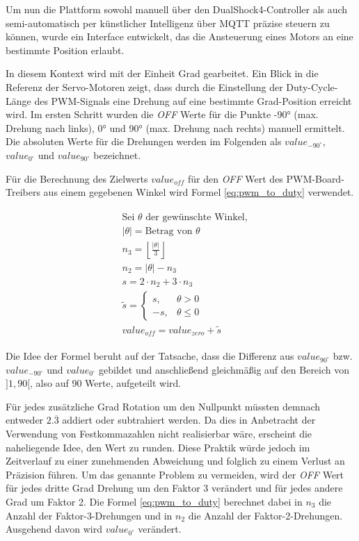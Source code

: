 Um nun die Plattform sowohl manuell über den DualShock4-Controller als auch semi-automatisch per künstlicher Intelligenz über MQTT präzise steuern zu können, wurde ein Interface entwickelt, das die Ansteuerung eines Motors an eine bestimmte Position erlaubt. 

In diesem Kontext wird mit der Einheit Grad gearbeitet. 
Ein Blick in die Referenz \cite{esp_servo_control} der Servo-Motoren zeigt, dass durch die Einstellung der Duty-Cycle-Länge des PWM-Signals eine Drehung auf eine bestimmte Grad-Position erreicht wird. 
Im ersten Schritt wurden die \textit{OFF} Werte für die Punkte \ang{-90} (max. Drehung nach links), \ang{0} und \ang{90} (max. Drehung nach rechts) manuell ermittelt.
Die absoluten Werte für die Drehungen werden im Folgenden als $value_{-90^\circ}$, $value_{0^\circ}$ und $value_{90^\circ}$ bezeichnet.

Für die Berechnung des Zielwerts $value_{off}$ für den \textit{OFF} Wert des PWM-Board-Treibers aus einem gegebenen Winkel wird Formel \ref{eq:pwm_to_duty} verwendet.

\begin{gather}
    \begin{aligned}
    &\text{Sei } \theta \text{ der gewünschte Winkel,} \\
    &|\theta| = \text{Betrag von } \theta \\
    &n_3 = \left\lfloor \frac{|\theta|}{3} \right\rfloor \\
    &n_2 = |\theta| - n_3 \\
    &s = 2 \cdot n_2 + 3 \cdot n_3 \\
    &\tilde{s} =
    \begin{cases}
    s, & \theta > 0 \\
    -s, & \theta \leq 0
    \end{cases} \\
    &value_{off} = value_{zero} + \tilde{s}
    \end{aligned}
    \label{eq:pwm_to_duty}
\end{gather}

Die Idee der Formel beruht auf der Tatsache, dass die Differenz aus $value_{90^\circ}$ bzw. $value_{-90^\circ}$ und $value_{0^\circ}$ gebildet und anschließend gleichmäßig auf den Bereich von $]1, 90[$, also auf 90 Werte, aufgeteilt wird. 

Für jedes zusätzliche Grad Rotation um den Nullpunkt müssten demnach entweder $2.\overline{3}$ addiert oder subtrahiert werden.
Da dies in Anbetracht der Verwendung von Festkommazahlen nicht realisierbar wäre, erscheint die naheliegende Idee, den Wert zu runden. 
Diese Praktik würde jedoch im Zeitverlauf zu einer zunehmenden Abweichung und folglich zu einem Verlust an Präzision führen.
Um das genannte Problem zu vermeiden, wird der \textit{OFF} Wert für jedes dritte Grad Drehung um den Faktor 3 verändert und für jedes andere Grad um Faktor 2.
Die Formel \ref{eq:pwm_to_duty} berechnet dabei in $n_3$ die Anzahl der Faktor-3-Drehungen und in $n_2$ die Anzahl der Faktor-2-Drehungen.
Ausgehend davon wird $value_{0^\circ}$ verändert.

